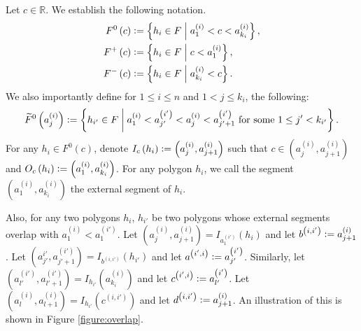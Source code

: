 \documentclass[12pt]{article}
\theoremstyle{definition}
\newcommand{\defeq}{\vcentcolon=}
\begin{document}
     Let $c \in \mathbb{R}$.
     We establish the following notation.
     \begin{align*}
         F^{0}\left(c\right) &\defeq
         \left\{h_{i} \in F \;\middle|\;
         a_{1}^{\left(i\right)}
         < c < a_{k_{i}}^{\left(i\right)}\right\}, \\
         F^{+}\left(c\right) &\defeq
         \left\{h_{i} \in F \;\middle|\;
         c < a_{1}^{\left(i\right)}\right\},\\
         F^{-}\left(c\right) &\defeq
         \left\{h_{i} \in F
         \;\middle|\; a_{k_{i}}^{\left(i\right)} < c\right\}.
     \end{align*}
     We also importantly define for
     $1 \leq i \leq n$ and 
     $1 < j \leq k_{i}$, 
     the following:
     \begin{gather*}
         \widetilde{F}^{0}\left(a_{j}^{\left(i\right)}\right)
         \defeq \left\{
         h_{i'} \in F \;\middle|\;
         a_{1}^{\left(i\right)} < a_{j'}^{\left(i'\right)}
         < a_{j}^{\left(i\right)}
         < a_{j'+1}^{\left(i'\right)}
         \text{ for some }
         1 \leq j' < k_{i'} \right\}.
     \end{gather*}
     For any $h_{i} \in F^{0}\left(c\right)$,
     denote $I_{c}\left(h_{i}\right)
     \defeq \left(a_{j}^{\left(i\right)},
     a_{j+1}^{\left(i\right)}\right)$ 
     such that $c \in 
     \left(a_{j}^{\left(i\right)},
     a_{j+1}^{\left(i\right)}\right)$ 
     and $O_{c}\left(h_{i}\right)
     \defeq \left(a_{1}^{\left(i\right)},
     a_{k_{i}}^{\left(i\right)}\right)$.
     For any polygon $h_{i}$,
     we call the segment
     $\left(a_{1}^{\left(i\right)},
     a_{k_{i}}^{\left(i\right)}\right)$
     the external
     segment of $h_{i}$.

     Also, for any two polygons
     $h_{i}$, $h_{i'}$ be two
     polygons whose external segments
     overlap with
     $a_1^{\left(i\right)} < a_1^{\left(i'\right)}$.
     Let $\left(a_{j}^{\left(i\right)},
     a_{j+1}^{\left(i\right)}\right) =
     I_{a_1^{\left(i'\right)}}\left(h_{i}\right)$
     and let
     $b^{\left(i, i'\right)} \defeq a_{j+1}^{\left(i\right)}$.
     Let $\left(a_{j'}^{i'}, a_{j'+1}^{\left(i'\right)}\right)
     = I_{b^{\left(i,i'\right)}}\left(h_{i'}\right)$ 
     and let $a^{\left(i',i\right)}
     \defeq a_{j'}^{\left(i'\right)}$.
     Similarly, let
     $\left(a^{\left(i'\right)}_{l'},
     a^{\left(i'\right)}_{l'+1}\right)
     = I_{h_{i'}}\left(a^{\left(i\right)}_{k_{i}}\right)$ 
     and let $c^{\left(i',i\right)}
     \defeq a^{\left(i'\right)}_{l'}$.
     Let $\left(a^{\left(i\right)}
     _{l}, a^{\left(i\right)}_{l+1}\right)
     = I_{h_{i'}}\left(c^{\left(i, i'\right)}\right)$
     and let 
     $d^{\left(i, i'\right)} \defeq
     a^{\left(i\right)}_{j+1}$.
     An illustration of 
     this is shown in Figure \ref{figure:overlap}.
\end{document}

